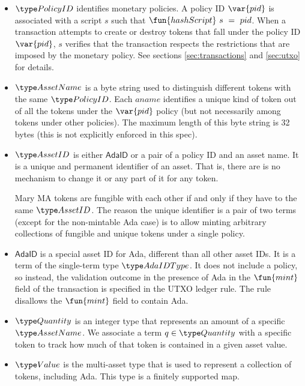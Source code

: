 \begin{itemize}
  \item $\PolicyID$ identifies monetary policies. A policy ID $\var{pid}$ is associated with a script
    $s$ such that $\fun{hashScript}~s~=~pid$. When a transaction attempts to create or destroy tokens
    that fall under the policy ID $\var{pid}$,
    $s$ verifies that the transaction
    respects the restrictions that are imposed by the monetary policy.
    See sections \ref{sec:transactions} and \ref{sec:utxo} for details.

  \item $\AssetName$ is a byte string used to distinguish different tokens with the same $\PolicyID$.
    Each $aname$ identifies a unique kind of token out of all the tokens under the
    $\var{pid}$ policy (but not necessarily among tokens under other policies).
    The maximum length of this
    byte string is 32 bytes (this is not explicitly enforced in this spec).

  \item $\AssetID$ is either $\mathsf{AdaID}$ or a pair of a policy ID and an asset name.
  It is a unique and permanent
  identifier of an asset. That is, there are is no mechanism to change it or
  any part of it for any token.

  Mary MA tokens are fungible with each other if and only if they have to the same $\AssetID$.
  The reason the unique identifier is a pair of two terms (except for the non-mintable Ada case) is to allow
  minting arbitrary collections of fungible and unique tokens under a single policy.

  \item $\mathsf{AdaID}$ is a special asset ID for Ada, different than all other asset IDs.
  It is a term of the single-term type $\AdaIDType$.
  It does not include a policy, so instead, the validation outcome in the presence
  of Ada in the $\fun{mint}$ field of the transaction is specified in the UTXO
  ledger rule. The rule disallows the $\fun{mint}$ field to contain Ada.

  \item $\Quantity$ is an integer type that represents an amount of a specific $\AssetName$. We associate
    a term $q\in\Quantity$ with a specific token to track how much of that token is contained in a given asset value.

  \item $\Value$ is the multi-asset type that is used to represent
    a collection of tokens, including Ada. This type is a finitely supported map.


\end{itemize}
